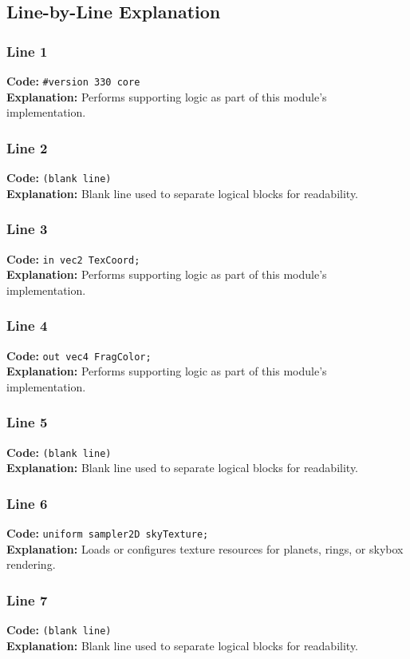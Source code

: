 \documentclass[11pt,a4paper]{article}
\begin{document}
\subsection{Line-by-Line Explanation}
\subsubsection*{Line 1}
\textbf{Code:} \verb|#version 330 core|\\
\textbf{Explanation:} Performs supporting logic as part of this module's implementation.

\subsubsection*{Line 2}
\textbf{Code:} \texttt{(blank line)}\\
\textbf{Explanation:} Blank line used to separate logical blocks for readability.

\subsubsection*{Line 3}
\textbf{Code:} \verb|in vec2 TexCoord;|\\
\textbf{Explanation:} Performs supporting logic as part of this module's implementation.

\subsubsection*{Line 4}
\textbf{Code:} \verb|out vec4 FragColor;|\\
\textbf{Explanation:} Performs supporting logic as part of this module's implementation.

\subsubsection*{Line 5}
\textbf{Code:} \texttt{(blank line)}\\
\textbf{Explanation:} Blank line used to separate logical blocks for readability.

\subsubsection*{Line 6}
\textbf{Code:} \verb|uniform sampler2D skyTexture;|\\
\textbf{Explanation:} Loads or configures texture resources for planets, rings, or skybox rendering.

\subsubsection*{Line 7}
\textbf{Code:} \texttt{(blank line)}\\
\textbf{Explanation:} Blank line used to separate logical blocks for readability.
\end{document}
